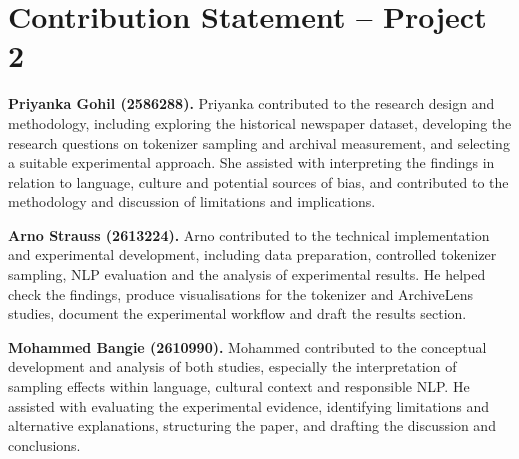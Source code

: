 \clearpage
\section*{Contribution Statement -- Project 2}

\noindent\textbf{Priyanka Gohil (2586288).}
Priyanka contributed to the research design and methodology, including exploring the historical newspaper dataset, developing the research questions on tokenizer sampling and archival measurement, and selecting a suitable experimental approach. She assisted with interpreting the findings in relation to language, culture and potential sources of bias, and contributed to the methodology and discussion of limitations and implications.

\medskip
\noindent\textbf{Arno Strauss (2613224).}
Arno contributed to the technical implementation and experimental development, including data preparation, controlled tokenizer sampling, NLP evaluation and the analysis of experimental results. He helped check the findings, produce visualisations for the tokenizer and ArchiveLens studies, document the experimental workflow and draft the results section.

\medskip
\noindent\textbf{Mohammed Bangie (2610990).}
Mohammed contributed to the conceptual development and analysis of both studies, especially the interpretation of sampling effects within language, cultural context and responsible NLP. He assisted with evaluating the experimental evidence, identifying limitations and alternative explanations, structuring the paper, and drafting the discussion and conclusions.
